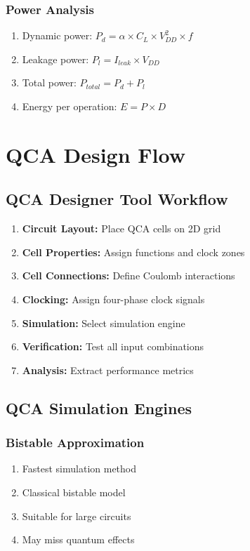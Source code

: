 \documentclass[12pt,a4paper,twoside]{report}
\begin{document}
\begin{appendices}
\subsubsection{Power Analysis}

\begin{enumerate}
    \item Dynamic power: $P_d = \alpha \times C_L \times V_{DD}^2 \times f$
    \item Leakage power: $P_l = I_{leak} \times V_{DD}$
    \item Total power: $P_{total} = P_d + P_l$
    \item Energy per operation: $E = P \times D$
\end{enumerate}

\section{QCA Design Flow}

\subsection{QCA Designer Tool Workflow}

\begin{enumerate}
    \item \textbf{Circuit Layout:} Place QCA cells on 2D grid
    \item \textbf{Cell Properties:} Assign functions and clock zones
    \item \textbf{Cell Connections:} Define Coulomb interactions
    \item \textbf{Clocking:} Assign four-phase clock signals
    \item \textbf{Simulation:} Select simulation engine
    \item \textbf{Verification:} Test all input combinations
    \item \textbf{Analysis:} Extract performance metrics
\end{enumerate}

\subsection{QCA Simulation Engines}

\subsubsection{Bistable Approximation}

\begin{enumerate}
    \item Fastest simulation method
    \item Classical bistable model
    \item Suitable for large circuits
    \item May miss quantum effects
\end{enumerate}


\end{appendices}
\end{document}
